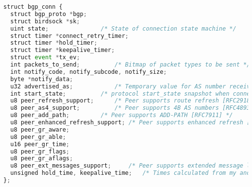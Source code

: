 \begin{lstlisting}[language=javascript,label={lst:bgpstruct},caption={Bird's BGP Protocol Session C Structure.}]
struct bgp_conn {
  struct bgp_proto *bgp;
  struct birdsock *sk;
  uint state;				/* State of connection state machine */
  struct timer *connect_retry_timer;
  struct timer *hold_timer;
  struct timer *keepalive_timer;
  struct event *tx_ev;
  int packets_to_send;			/* Bitmap of packet types to be sent */
  int notify_code, notify_subcode, notify_size;
  byte *notify_data;
  u32 advertised_as;			/* Temporary value for AS number received */
  int start_state;			/* protocol start_state snapshot when connection established */
  u8 peer_refresh_support;		/* Peer supports route refresh [RFC2918] */
  u8 peer_as4_support;			/* Peer supports 4B AS numbers [RFC4893] */
  u8 peer_add_path;			/* Peer supports ADD-PATH [RFC7911] */
  u8 peer_enhanced_refresh_support;	/* Peer supports enhanced refresh [RFC7313] */
  u8 peer_gr_aware;
  u8 peer_gr_able;
  u16 peer_gr_time;
  u8 peer_gr_flags;
  u8 peer_gr_aflags;
  u8 peer_ext_messages_support;		/* Peer supports extended message length [draft] */
  unsigned hold_time, keepalive_time;	/* Times calculated from my and neighbor's requirements */
};
\end{lstlisting}